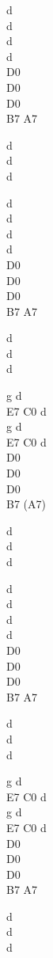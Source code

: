 \begin{chord}
    d\\
    d\\
    d\\
    d\\
    D0\\
    D0\\
    D0\\
    B7 A7

    d\\
    d\\
    d

    d\\
    d\\
    d\\
    d\\
    D0\\
    D0\\
    D0\\
    B7 A7

    d\\
    d\\
    d

    g d\\
    E7 C0 d\\
    g d\\
    E7 C0 d\\
    D0\\
    D0\\
    D0\\
    B7 (A7)

    d\\
    d\\
    d

    d\\
    d\\
    d\\
    d\\
    D0\\
    D0\\
    D0\\
    B7 A7

    d\\
    d\\
    d

    g d\\
    E7 C0 d\\
    g d\\
    E7 C0 d\\
    D0\\
    D0\\
    D0\\
    B7 A7

    d\\
    d\\
    d
\end{chord}